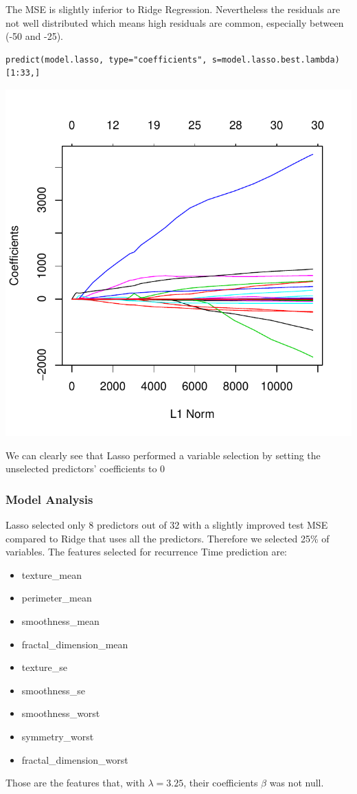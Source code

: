 \documentclass[]{report}
\begin{document}
The MSE is slightly inferior to Ridge Regression. Nevertheless the residuals are not well distributed which means high residuals are common, especially between (-50 and -25).

\begin{lstlisting}
predict(model.lasso, type="coefficients", s=model.lasso.best.lambda)[1:33,]
\end{lstlisting}

\begin{center}
	\includegraphics[width=0.8\linewidth]{Figures/lasso_coeff}
\end{center}
We can clearly see that Lasso performed a variable selection by setting the unselected predictors' coefficients to 0

\subsubsection{Model Analysis}
 Lasso selected only 8 predictors out of 32 with a slightly improved test MSE compared to Ridge that uses all the predictors. Therefore we selected 25\% of variables. The features selected for recurrence Time prediction are:
 \begin{itemize} 
 \item texture\_mean
 \item perimeter\_mean
 \item smoothness\_mean
 \item fractal\_dimension\_mean
 \item texture\_se
 \item smoothness\_se
 \item smoothness\_worst
 \item symmetry\_worst
 \item fractal\_dimension\_worst
\end{itemize}
Those are the features that, with $\lambda = 3.25$, their coefficients $\beta$ was not null.
\end{document}
